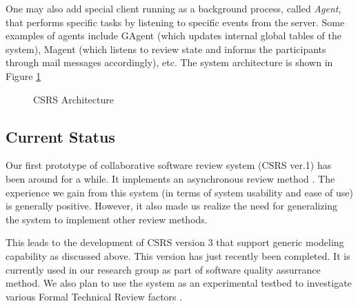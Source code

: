 One may also add special client running as a background process,
called {\it Agent}, that performs specific 
tasks by listening to specific events from the server.
Some examples of agents include GAgent (which updates internal global
tables of the system), Magent (which listens to review state
and informs the participants through mail messages accordingly), etc. 
The system architecture is shown in Figure \ref{fig:csrs-architecture}

\begin{figure}[htb]
  {\centerline{}}
  \caption{CSRS Architecture}
  \label{fig:csrs-architecture}
\end{figure}

\subsection{Current Status}


Our first prototype of collaborative software review system (CSRS ver.1)
has been around for a while. It implements an asynchronous review
method \cite{Johnson93}. 
The experience we gain from this system 
(in terms of system usability and ease of use) is generally positive.
However, it also made us realize the need
for generalizing the system to implement other review methods.  

This leads to the development of CSRS version 3 that support generic
modeling capability as discussed above. This version has just recently
been completed. It is currently
used in our research group as part of software quality assurrance
method. We also plan to use the system as an experimental testbed to
investigate various Formal Technical Review factors \cite{CSDL-94-07}. 


\newpage









